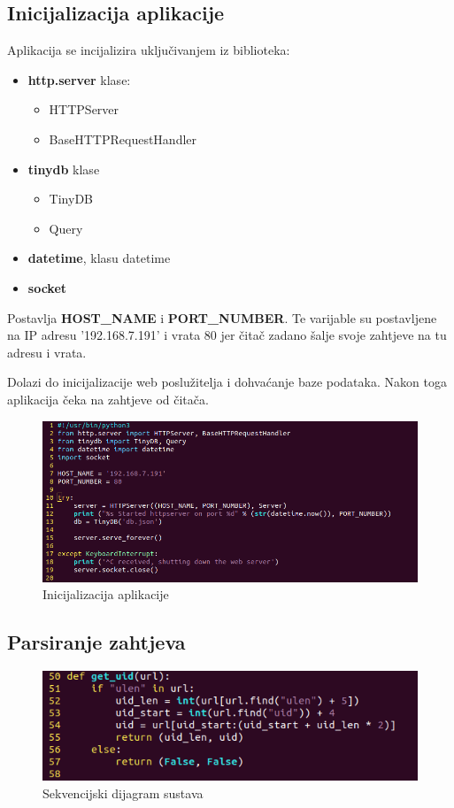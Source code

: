 \documentclass[times, utf8, zavrsni]{fer}
\begin{document}
\subsection{Inicijalizacija aplikacije}
Aplikacija se incijalizira uključivanjem iz biblioteka:
\begin{itemize}
\item \textbf{http.server} klase:
	\begin{itemize}
	\item HTTPServer
	\item BaseHTTPRequestHandler
	\end{itemize}
\item \textbf{tinydb} klase
	\begin{itemize}
	\item TinyDB
	\item Query
	\end{itemize}
\item \textbf{datetime}, klasu datetime
\item \textbf{socket}
\end{itemize}

Postavlja \textbf{HOST\_NAME} i \textbf{PORT\_NUMBER}. Te varijable su postavljene na IP adresu '192.168.7.191' i vrata 80  jer čitač zadano šalje svoje zahtjeve na tu adresu i vrata.\par
Dolazi do inicijalizacije web poslužitelja i dohvaćanje baze podataka. Nakon toga aplikacija čeka na zahtjeve od čitača.

\begin{figure}[h]
\includegraphics[scale=0.5]{init.png}
\centering
\caption{Inicijalizacija aplikacije}
\centering
\end{figure}

\subsection{Parsiranje zahtjeva}

\begin{figure}[h]
\includegraphics[scale=0.5]{parsiranje.png}
\centering
\caption{Sekvencijski dijagram sustava}
\centering
\end{figure}
\end{document}
